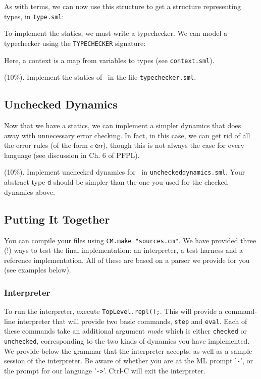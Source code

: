 \documentclass[11pt]{article}
\newcounter{taskcounter}
\newcounter{taskPercentCounter}
\newcommand{\task}[1]
  {\bigskip \noindent {\bf Task\addtocounter{taskPercentCounter}{#1} \arabic{taskcounter}\addtocounter{taskcounter}{1}} (#1\%).}
\newcommand{\err}[1]{#1~\textsf{err}}
\begin{document}


As with terms, we can now use this structure to get a structure representing types, in \verb|type.sml|:



To implement the statics, we must write a typechecker. We can model a typechecker using the \verb|TYPECHECKER| signature:



\noindent
Here, a context is a map from variables to types (see \verb|context.sml|).

\task{10} Implement the statics of \Lnumstr~in the file \verb|typechecker.sml|.




\subsection{Unchecked Dynamics}

Now that we have a statics, we can implement a simpler dynamics that does away with unnecessary error checking. In fact, in this case, we can get rid of all the error rules (of the form $\err{e}$), though this is not always the case for every language (see discussion in Ch. 6 of PFPL).

\task{10} Implement unchecked dynamics for \Lnumstr~in \verb|uncheckeddynamics.sml|. Your abstract type \verb|d| should be simpler than the one you used for the checked dynamics above.

\subsection{Putting It Together}
You can compile your files using \verb|CM.make "sources.cm"|. We have provided three (!) ways to test the final implementation: an interpreter, a test harness and a reference implementation. All of these are based on a parser we provide for you (see examples below).

\subsubsection{Interpreter}

To run the interpreter, execute \texttt{TopLevel.repl();}.  This will provide a command-line interpreter that will provide two basic commands, \texttt{step} and \texttt{eval}.
Each of these commands take an additional argument \textit{mode} which is either \texttt{checked} or \texttt{unchecked},  corresponding to the two kinds of dynamics you have implemented. We provide below the grammar that the interpreter accepts, as well as a sample session of the interpreter. Be aware of whether you are at the ML prompt '\texttt{-}', or the prompt for our language '\texttt{->}'.  Ctrl-C will exit the interpreter.
\end{document}
